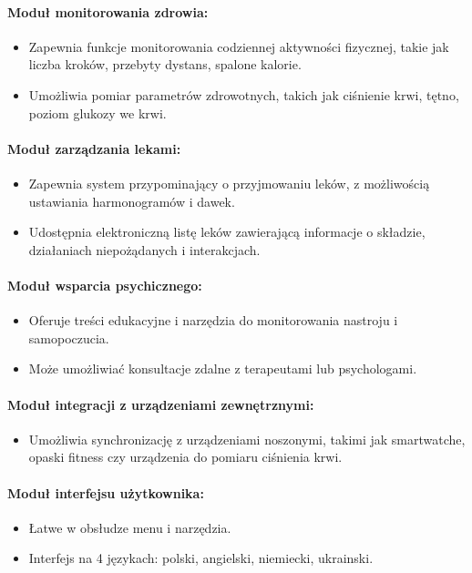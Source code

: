 \paragraph{Moduł monitorowania zdrowia:}
\begin{itemize}
  \item Zapewnia funkcje monitorowania codziennej aktywności fizycznej, takie jak liczba kroków, przebyty dystans, spalone kalorie.
  \item Umożliwia pomiar parametrów zdrowotnych, takich jak ciśnienie krwi, tętno, poziom glukozy we krwi.
\end{itemize}

\paragraph{Moduł zarządzania lekami:}
\begin{itemize}
  \item Zapewnia system przypominający o przyjmowaniu leków, z możliwością ustawiania harmonogramów i dawek.
  \item Udostępnia elektroniczną listę leków zawierającą informacje o składzie, działaniach niepożądanych i interakcjach.
\end{itemize}

\paragraph{Moduł wsparcia psychicznego:}
\begin{itemize}
  \item Oferuje treści edukacyjne i narzędzia do monitorowania nastroju i samopoczucia.
  \item Może umożliwiać konsultacje zdalne z terapeutami lub psychologami.
\end{itemize}

\paragraph{Moduł integracji z urządzeniami zewnętrznymi:}
\begin{itemize}
  \item Umożliwia synchronizację z urządzeniami noszonymi, takimi jak smartwatche, opaski fitness czy urządzenia do pomiaru ciśnienia krwi.
\end{itemize}

\paragraph{Moduł interfejsu użytkownika:}
\begin{itemize}
  \item Łatwe w obsłudze menu i narzędzia.
  \item Interfejs na 4 językach: polski, angielski, niemiecki, ukrainski.
\end{itemize}

